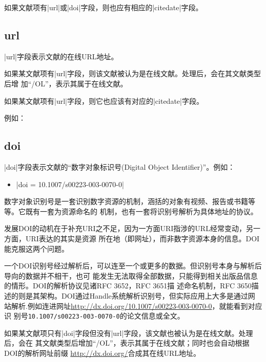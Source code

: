 如果文献项有|url|或|doi|字段，则也应有相应的|citedate|字段。

\subsection{url}\label{subsec:bibfield-url}

|url|字段表示文献的在线URL地址。

如果某文献项有|url|字段，则该文献被认为是在线文献。{\BibTeX}处理后，会在其文献类型后增
加``/OL''，表示其属于在线文献。

如果某文献项有|url|字段，则它也应该有对应的|citedate|字段。

例如：


\subsection{doi}\label{subsec:bibfield-doi}

|doi|字段表示文献的``数字对象标识号(Digital Object Identifier)''。例如：
\begin{itemize}
\item |doi = {10.1007/s00223-003-0070-0}|
\end{itemize}

数字对象识别号是一套识别数字资源的机制，涵括的对象有视频、报告或书籍等等。它既有一套为资源命名的
机制，也有一套将识别号解析为具体地址的协议。

发展DOI的动机在于补充URI之不足，因为一方面URI指涉的URL经常变动，另一方面，URI表达的其实是资源
所在地（即网址），而非数字资源本身的信息。DOI能克服这两个问题。

一个DOI识别号经过解析后，可以连至一个或更多的数据。但识别号本身与解析后导向的数据并不相干，也可
能发生无法取得全部数据，只能得到相关出版品信息的情形。DOI的解析协议见诸RFC 3652，RFC 3651描
述命名机制，RFC 3650描述的则是其架构。DOI通过Handle系统解析识别号，但实际应用上大多是通过网
站解析.例如连进网址\url{http://dx.doi.org/10.1007/s00223-003-0070-0}，就能看到对应识
别号\texttt{10.1007/s00223-003-0070-0}的论文信息或全文。

如果某文献项只有|doi|字段但没有|url|字段，该文献也被认为是在线文献。{\BibTeX}处理后，会在
其文献类型后增加``/OL''，表示其属于在线文献；同时也会自动根据DOI的解析网址前缀
\url{http://dx.doi.org/}合成其在线URL地址。


